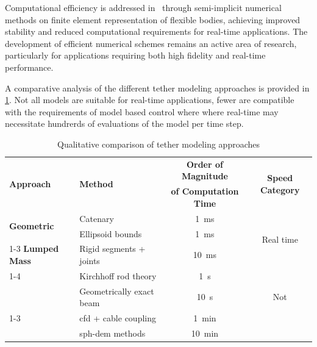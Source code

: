 Computational efficiency is addressed in~\cite{westinEfficientSemiimplicitNumerical2023} through
semi-implicit numerical methods on finite element representation of flexible bodies, achieving
improved stability and reduced computational requirements for real-time applications. The
development of efficient numerical schemes remains an active area of research, particularly for
applications requiring both high fidelity and real-time performance.

A comparative analysis of the different tether modeling approaches is provided in
\cref{sota_sm_tm_comparison}. Not all models are suitable for real-time applications, fewer are
compatible with the requirements of model based control where where real-time may necessitate
hundrerds of evaluations of the model per time step.

\begin{table}
	\centering
	\caption{Qualitative comparison of tether modeling approaches}
	\label{sota_sm_tm_comparison}
	\begin{tabular}{@{}llcc@{}}
		\toprule
		\multirow{2}{*}{\textbf{Approach}}       & \multirow{2}{*}{\textbf{Method}} & \textbf{Order of Magnitude}  & \multirow{2}{*}{\textbf{Speed Category}} \\
		                                         &                                  & \textbf{of Computation Time} &                                          \\
		\midrule
		\multirow{2}{*}{\textbf{Geometric}}      & Catenary                         & \qty{1}{\milli\second}       & \multirow{3}{*}{Real time}               \\
		                                         & Ellipsoid bounds                 & \qty{1}{\milli\second}       &                                          \\
		\cmidrule(lr){1-3}
		\textbf{Lumped Mass}                     & Rigid segments + joints          & \qty{10}{\milli\second}      &                                          \\
		\cmidrule(lr){1-4}
		\multirow{2}{*}{\textbf{Finite Element}} & Kirchhoff rod theory             & \qty{1}{\second}             & \multirow{3}{*}{Not}                     \\
		                                         & Geometrically exact beam         & \qty{10}{\second}            & \multirow{3}{*}{real time}               \\
		\cmidrule(lr){1-3}
		\multirow{2}{*}{\textbf{Continuum}}      & \acs{cfd} + cable coupling       & \qty{1}{\minute}             &                                          \\
		                                         & \acs{sph}-\acs{dem} methods      & \qty{10}{\minute}            &                                          \\
		\bottomrule
	\end{tabular}
\end{table}

